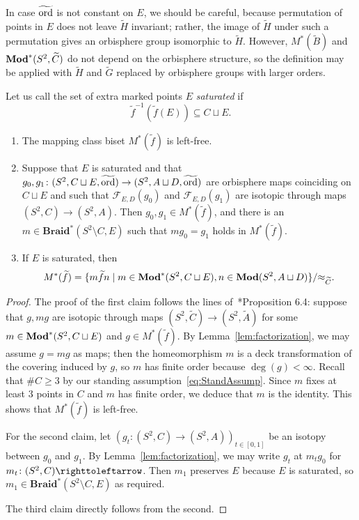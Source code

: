 \documentclass{amsart}
\newcommand\Forget{{\mathcal F}}
\newcommand\Braid{{\mathbf{Braid}}}
\newcommand\wtf{{\widetilde f}}
\newcommand\wtA{{\widetilde A}}
\newcommand\wtB{{\widetilde B}}
\newcommand\wtC{{\widetilde C}}
\newcommand\wtG{{\widetilde G}}
\newcommand\wtH{{\widetilde H}}
\newcommand\wtord{{\widetilde\ord}}
\begin{document}
In case $\wtord$ is not constant on $E$, we should be careful,
because permutation of points in $E$ does not leave $\wtH$ invariant;
rather, the image of $\wtH$ under such a permutation gives an
orbisphere group isomorphic to $\wtH$. However, $M^*(\wtB)$ and
$\Mod^*(S^2,\wtC)$ do not depend on the orbisphere structure, so the
definition may be applied with $\wtH$ and $\wtG$ replaced by orbisphere groups
with larger orders.

Let us call the set of extra marked points $E$ \emph{saturated} if
\[\wtf^{-1}(\wtf(E))\subseteq C\sqcup E.\]

\begin{lem}\label{lem:M* is left free}
  \begin{enumerate}
  \item The mapping class biset $M^*(\wtf)$ is left-free.

  \item Suppose that $E$ is saturated and that
    $g_0,g_1\colon (S^2,C\sqcup E,\wtord)\to(S^2,A\sqcup D,\wtord)$
    are orbisphere maps coinciding on $C\sqcup E$ and such that
    $\Forget_{E,D}(g_0)$ and $\Forget_{E,D}(g_1)$ are isotopic through
    maps $(S^2,C)\to(S^2,A)$. Then $g_0,g_1\in M^*(\wtf)$, and there
    is an $m\in \Braid^*(S^2\setminus C,E)$ such that $m g_0=g_1$
    holds in $M^*(\wtf)$.

  \item If $E$ is saturated, then
    \begin{equation}\label{eq:defn:M*}
      M^*(\wtf)= \{m \wtf n\mid m\in \Mod^*(S^2,C\sqcup E), n\in \Mod(S^2,A\sqcup D)\}/{\approx_\wtC}.
    \end{equation}
  \end{enumerate}
\end{lem}
\begin{proof}
  The proof of the first claim follows the lines
  of~\cite{bartholdi-dudko:bc2}*{Proposition 6.4}: suppose that
  $g,m g$ are isotopic through maps $(S^2,\wtC)\to(S^2,\wtA)$ for some
  $m\in \mathbf{\relax Mod}^*(S^2,C\sqcup E)$ and $g\in M^*(\wtf)$. By
  Lemma~\ref{lem:factorization}, we may assume $g= m g$ as maps; then
  the homeomorphism $m$ is a deck transformation of the covering
  induced by $g$, so $m$ has finite order because $\deg
  (g)<\infty$. Recall that $\#C\ge 3$ by our standing
  assumption~\eqref{eq:StandAssump}. Since $m$ fixes at least $3$
  points in $C$ and $m$ has finite order, we deduce that $m$ is the
  identity. This shows that $M^*(\wtf) $ is left-free.

  For the second claim, let
  $(g_t\colon (S^2,C)\to (S^2,A))_{t\in[0,1]}$ be an isotopy between
  $g_0$ and $g_1$. By Lemma~\ref{lem:factorization}, we may write
  $g_t$ at $m_t g_0$ for $m_t\colon (S^2,C)\selfmap$. Then $m_1$
  preserves $E$ because $E$ is saturated, so
  $m_1\in \Braid^*(S^2\setminus C,E)$ as required.

  The third claim directly follows from the second.
\end{proof}
\end{document}
